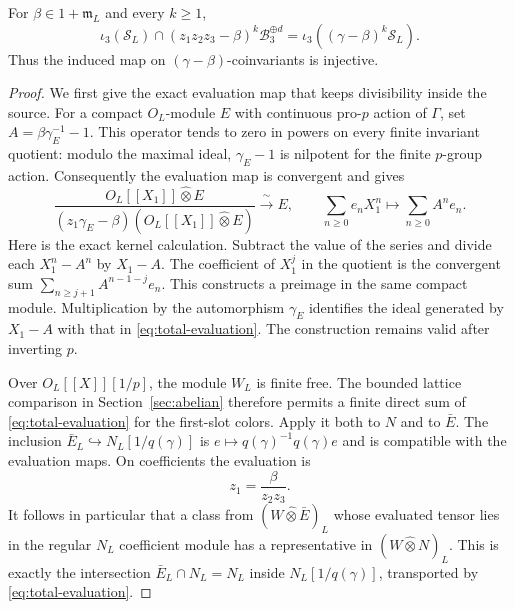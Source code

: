 \begin{proposition}\label{prop:degree-three-saturation}
For $\beta\in1+\mathfrak m_L$ and every $k\geq1$,
\[
 \iota_3(\mathcal S_L)\cap
 (z_1z_2z_3-\beta)^k\mathcal B_3^{\oplus d}
       =\iota_3((\gamma-\beta)^k\mathcal S_L).
\]
Thus the induced map on $(\gamma-\beta)$-coinvariants
is injective.
\end{proposition}
\begin{proof}
We first give the exact evaluation map that keeps
divisibility inside the source. For a compact
$O_L$-module $E$ with continuous pro-$p$ action of
$\Gamma$, set $A=\beta\gamma_E^{-1}-1$.
This operator tends to zero in powers on every finite
invariant quotient: modulo the maximal ideal,
$\gamma_E-1$ is nilpotent for the finite $p$-group action.
Consequently the evaluation map is convergent and gives
\begin{equation}\label{eq:total-evaluation}
 \frac{O_L[[X_1]]\widehat\otimes E}
 {(z_1\gamma_E-\beta)(O_L[[X_1]]\widehat\otimes E)}
 \xrightarrow{\ \sim\ }E,\qquad
        \sum_{n\geq0}e_nX_1^n\longmapsto\sum_{n\geq0}A^ne_n.
\end{equation}
Here is the exact kernel calculation. Subtract the value
of the series and divide each $X_1^n-A^n$ by $X_1-A$.
The coefficient of $X_1^j$ in the quotient is the
convergent sum $\sum_{n\geq j+1}A^{n-1-j}e_n$.
This constructs a preimage in the same compact module.
Multiplication by the automorphism $\gamma_E$ identifies
the ideal generated by $X_1-A$ with that in
\eqref{eq:total-evaluation}.
The construction remains valid after inverting $p$.

Over $O_L[[X]][1/p]$, the module $W_L$ is finite free.
The bounded lattice comparison in Section~\ref{sec:abelian}
therefore permits a finite direct sum of
\eqref{eq:total-evaluation} for the first-slot colors.
Apply it both to $N$ and to $\bar E$.
The inclusion $\bar E_L\hookrightarrow N_L[1/q(\gamma)]$
is $e\mapsto q(\gamma)^{-1}q(\gamma)e$ and is compatible
with the evaluation maps. On coefficients the evaluation is
\[
                         z_1=\frac{\beta}{z_2z_3}.
\]
It follows in particular that a class from
$(W\widehat\otimes\bar E)_L$ whose evaluated tensor
lies in the regular $N_L$ coefficient module has a
representative in $(W\widehat\otimes N)_L$.
This is exactly the intersection $\bar E_L\cap N_L=N_L$
inside $N_L[1/q(\gamma)]$, transported by
\eqref{eq:total-evaluation}.


\end{proof}
